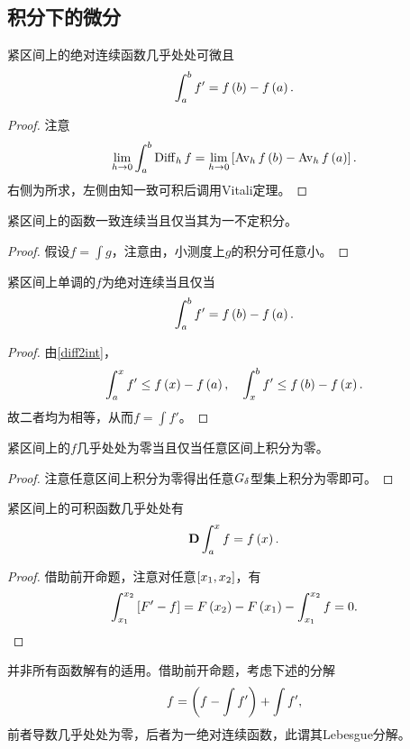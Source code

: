 \documentclass{ctexrep}
\begin{document}
  \subsection{积分下的微分}
  \begin{theorem}
    \label{thm:int2dif}
    紧区间上的绝对连续函数几乎处处可微且
    \[ \int_a^b f' = f\left(b\right) - f\left(a\right). \]
  \end{theorem}
  \begin{proof}
    注意
    \[ \lim_{h\to 0}\int_a^b \mathrm{Diff}_{h}\, f = \lim_{h\to 0} \left[\mathrm{Av}_{h}\, f\left(b\right) - \mathrm{Av}_{h}\, f\left(a\right)\right]. \]
    右侧为所求，左侧由知一致可积后调用Vitali定理。
  \end{proof}
  \begin{theorem}
    紧区间上的函数一致连续当且仅当其为一不定积分。
  \end{theorem}
  \begin{proof}
    假设$f=\int g$，注意由，小测度上$g$的积分可任意小。
  \end{proof}
  \begin{collary}
    紧区间上单调的$f$为绝对连续当且仅当
    \[ \int_a^b f' = f\left(b\right)-f\left(a\right). \]
  \end{collary}
  \begin{proof}
    由\cref{diff2int}，
    \[ \int_a^x f' \le f\left(x\right)-f\left(a\right),\quad \int_x^b f' \le f\left(b\right)-f\left(x\right). \]
    故二者均为相等，从而$f=\int f'$。
  \end{proof}
  \begin{lemma}
    紧区间上的$f$几乎处处为零当且仅当任意区间上积分为零。
  \end{lemma}
  \begin{proof}
    注意任意区间上积分为零得出任意$G_\delta$型集上积分为零即可。
  \end{proof}
  \begin{theorem}
    紧区间上的可积函数几乎处处有
    \[ \mathbf{D} \int_a^x f = f\left(x\right). \]
  \end{theorem}
  \begin{proof}
    借助前开命题，注意对任意$\left[x_1,x_2\right]$，有
    \[ \int_{x_1}^{x_2}\left[F'-f\right] = F\left(x_2\right)-F\left(x_1\right) - \int_{x_1}^{x_2} f = 0. \qedhere \]
  \end{proof}
  并非所有函数解有的适用。借助前开命题，考虑下述的分解
  \[ f = \left(f-\int f'\right) + \int f', \]
  前者导数几乎处处为零，后者为一绝对连续函数，此谓其Lebesgue分解。
\end{document}
